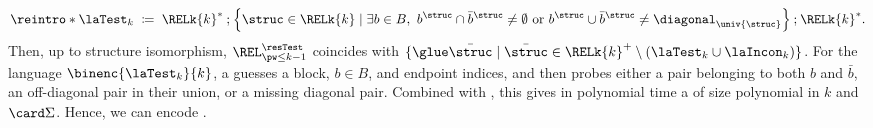 \documentclass[10pt,a4paper]{article}
\theoremstyle{definition}
\theoremstyle{remark}
\DeclarePairedDelimiter\set{\{}{\}}
\newcommand{\defeq}{\coloneq}
\newcommand{\mul}[1]{\bar{#1}}
\newcommand{\compo}{\mathbin{;}}
\newcommand{\vsig}{\Sigma}
\begin{document}
\AP
{}
\[\reintro*\laTest_{k} \;\defeq\;
\RELk{k}^{*} \compo
\set*{\struc \in \RELk{k} \mid \exists b \in B,\
b^{\struc} \cap \bar{b}^{\struc} \neq \emptyset
\text{ or } b^{\struc} \cup \bar{b}^{\struc} \neq \diagonal_{\univ{\struc}} } \compo
\RELk{k}^{*}.\]
Then, up to structure isomorphism,
$\REL^{\resTest}_{\pw \le k-1}$ coincides with
$\set{\glue \mul{\struc} \mid \mul{\struc} \in \RELk{k}^{+} \setminus (\laTest_{k} \cup \laIncon_{k})}$.
For the language $\binenc{\laTest_{k}}{k}$,
a  guesses a block, $b\in B$, and endpoint indices, and then probes either
a pair belonging to both $b$ and $\bar b$, an off-diagonal pair in their union,
or a missing diagonal pair.
Combined with , this gives in polynomial time
a \kl{2AFA} of size polynomial in $k$ and $\card\vsig$.
Hence, we can encode .
\end{document}
